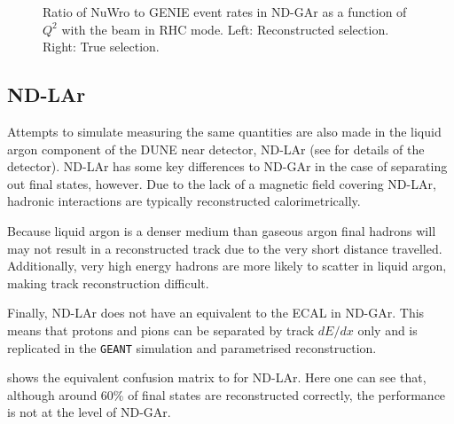 \begin{figure}[h]
	\begin{minipage}[t]{.5\linewidth}
		\begin{adjustbox}{max totalsize=\linewidth, center}
			
		\end{adjustbox}
	\end{minipage}
	\hfill
	\begin{minipage}[t]{.5\linewidth}
		\begin{adjustbox}{max totalsize=\linewidth, center}
			
		\end{adjustbox}
	\end{minipage}
	\caption[Comparison of NuWro and GENIE in $Q^{2}$ for reverse horn current]{Ratio of NuWro to GENIE event rates in ND-GAr as a function of $Q^{2}$ with the beam in RHC mode. Left: Reconstructed selection. Right: True selection.}
	\label{fig:Q2CompRhc}
\end{figure}

\subsection{ND-LAr}
\label{sec:dune_ndrwt:pionMulti:lar}

Attempts to simulate measuring the same quantities are also made in the liquid argon component of the DUNE near detector, ND-LAr (see  for details of the detector).
ND-LAr has some key differences to ND-GAr in the case of separating out final states, however. 
Due to the lack of a magnetic field covering ND-LAr, hadronic interactions are typically reconstructed calorimetrically.

Because liquid argon is a denser medium than gaseous argon final hadrons will may not result in a reconstructed track due to the very short distance travelled.
Additionally, very high energy hadrons are more likely to scatter in liquid argon, making track reconstruction difficult.

Finally, ND-LAr does not have an equivalent to the ECAL in ND-GAr.
This means that protons and pions can be separated by track $dE/dx$ only and is replicated in the \texttt{GEANT} simulation and parametrised reconstruction.

 shows the equivalent confusion matrix to  for ND-LAr.
Here one can see that, although around 60\% of final states are reconstructed correctly, the performance is not at the level of ND-GAr.

